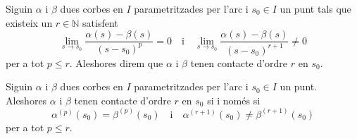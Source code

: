 \documentclass[../Apunts.tex]{subfiles}
\begin{document}
	\begin{definition}[Contacte]
		\label{def:contacte entre dues corbes parametritzades per l'arc}
		Siguin \(\alpha\) i \(\beta\) dues corbes en \(I\) parametritzades per l'arc i \(s_{0}\in I\) un punt tals que existeix un \(r\in\mathbb{N}\) satisfent
		\[\lim_{s\to s_{0}}\frac{\alpha(s)-\beta(s)}{(s-s_{0})^{p}}=0\quad\text{i}\quad\lim_{s\to s_{0}}\frac{\alpha(s)-\beta(s)}{(s-s_{0})^{r+1}}\neq0\]
		per a tot \(p\leq r\). Aleshores direm que \(\alpha\) i \(\beta\) tenen contacte d'ordre \(r\) en \(s_{0}\).
	\end{definition}
	\begin{proposition}
		\label{prop:contacte r és equivalent a tenir les r primeres derivades iguals}
		Siguin \(\alpha\) i \(\beta\) dues corbes en \(I\) parametritzades per l'arc i \(s_{0}\in I\) un punt. Aleshores \(\alpha\) i \(\beta\) tenen contacte d'ordre \(r\) en \(s_{0}\) si i només si
		\[\alpha^{(p)}(s_{0})=\beta^{(p)}(s_{0})\quad\text{i}\quad\alpha^{(r+1)}(s_{0})\neq\beta^{(r+1)}(s_{0})\]
		per a tot \(p\leq r\).
	\end{proposition}
\end{document}
